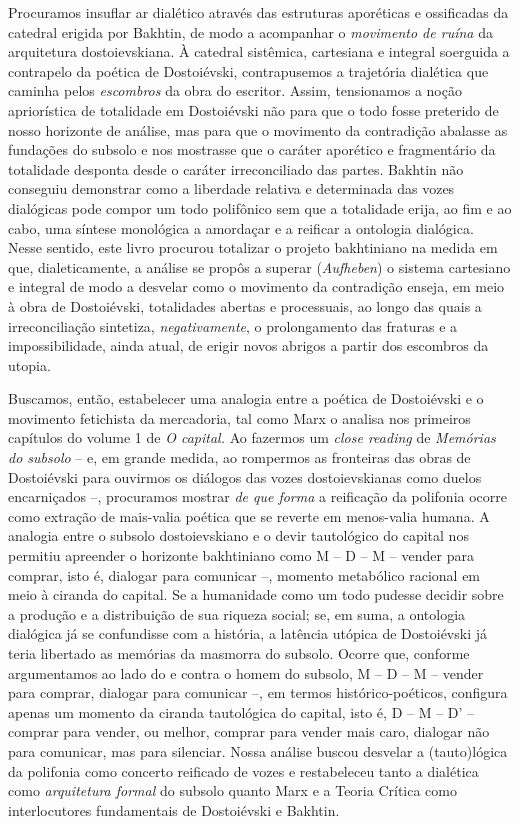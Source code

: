 Procuramos insuflar ar dialético através das estruturas aporéticas e
ossificadas da catedral erigida por Bakhtin, de modo a acompanhar o
\emph{movimento de ruína} da arquitetura dostoievskiana. À catedral
sistêmica, cartesiana e integral soerguida a contrapelo da poética de
Dostoiévski, contrapusemos a trajetória dialética que caminha pelos
\emph{escombros} da obra do escritor. Assim, tensionamos a noção
apriorística de totalidade em Dostoiévski não para que o todo fosse
preterido de nosso horizonte de análise, mas para que o movimento da
contradição abalasse as fundações do subsolo e nos mostrasse que o
caráter aporético e fragmentário da totalidade desponta desde o caráter
irreconciliado das partes. Bakhtin não conseguiu demonstrar como a
liberdade relativa e determinada das vozes dialógicas pode compor um
todo polifônico sem que a totalidade erija, ao fim e ao cabo, uma
síntese monológica a amordaçar e a reificar a ontologia dialógica. Nesse
sentido, este livro procurou totalizar o projeto bakhtiniano na medida
em que, dialeticamente, a análise se propôs a superar (\emph{Aufheben})
o sistema cartesiano e integral de modo a desvelar como o movimento da
contradição enseja, em meio à obra de Dostoiévski, totalidades abertas e
processuais, ao longo das quais a irreconciliação sintetiza,
\emph{negativamente}, o prolongamento das fraturas e a impossibilidade,
ainda atual, de erigir novos abrigos a partir dos escombros da utopia.

Buscamos, então, estabelecer uma analogia entre a poética de Dostoiévski
e o movimento fetichista da mercadoria, tal como Marx o analisa nos
primeiros capítulos do volume 1 de \emph{O capital.} Ao fazermos um
\emph{close reading} de \emph{Memórias do subsolo} -- e, em grande
medida, ao rompermos as fronteiras das obras de Dostoiévski para
ouvirmos os diálogos das vozes dostoievskianas como duelos encarniçados
--, procuramos mostrar \emph{de que forma} a reificação da polifonia
ocorre como extração de mais-valia poética que se reverte em menos-valia
humana. A analogia entre o subsolo dostoievskiano e o devir tautológico
do capital nos permitiu apreender o horizonte bakhtiniano como M -- D --
M -- vender para comprar, isto é, dialogar para comunicar --, momento
metabólico racional em meio à ciranda do capital. Se a humanidade como
um todo pudesse decidir sobre a produção e a distribuição de sua riqueza
social; se, em suma, a ontologia dialógica já se confundisse com a
história, a latência utópica de Dostoiévski já teria libertado as
memórias da masmorra do subsolo. Ocorre que, conforme argumentamos ao
lado do e contra o homem do subsolo, M -- D -- M -- vender para comprar,
dialogar para comunicar --, em termos histórico-poéticos, configura
apenas um momento da ciranda tautológica do capital, isto é, D -- M --
D' -- comprar para vender, ou melhor, comprar para vender mais caro,
dialogar não para comunicar, mas para silenciar. Nossa análise buscou
desvelar a (tauto)lógica da polifonia como concerto reificado de vozes e
restabeleceu tanto a dialética como \emph{arquitetura formal} do subsolo
quanto Marx e a Teoria Crítica como interlocutores fundamentais de
Dostoiévski e Bakhtin.

